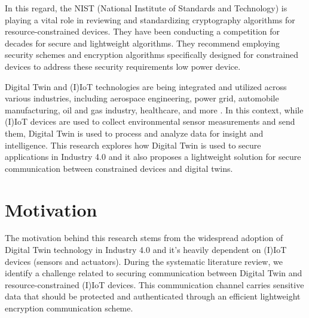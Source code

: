 








In this regard, the NIST (National Institute of Standards and Technology) is playing a vital role in reviewing and standardizing cryptography algorithms for resource-constrained devices. They have been conducting a competition for decades for secure and lightweight algorithms. They recommend employing security schemes and encryption algorithms specifically designed for constrained devices to address these security requirements \cite{noauthor_nist_2023} low power device.

Digital Twin and (I)IoT technologies are being integrated and utilized across various industries, including aerospace engineering, power grid, automobile manufacturing, oil and gas industry, healthcare, and more \cite{tao_digital_2019}. In this context, while (I)IoT devices are used to collect environmental sensor measurements and send them,  Digital Twin is used to process and analyze data for insight and intelligence. This research explores how Digital Twin is used to secure applications in Industry 4.0 and it also proposes a lightweight solution for secure communication between constrained devices and digital twins.



\section{Motivation}
The motivation behind this research stems from the widespread adoption of Digital Twin technology in Industry 4.0 \cite{atalay_digital_2022} and it's heavily dependent on (I)IoT devices (sensors and actuators). During the systematic literature review, we identify a challenge related to securing communication between Digital Twin and resource-constrained (I)IoT devices. This communication channel carries sensitive data that should be protected and authenticated through an efficient lightweight encryption communication scheme. 


